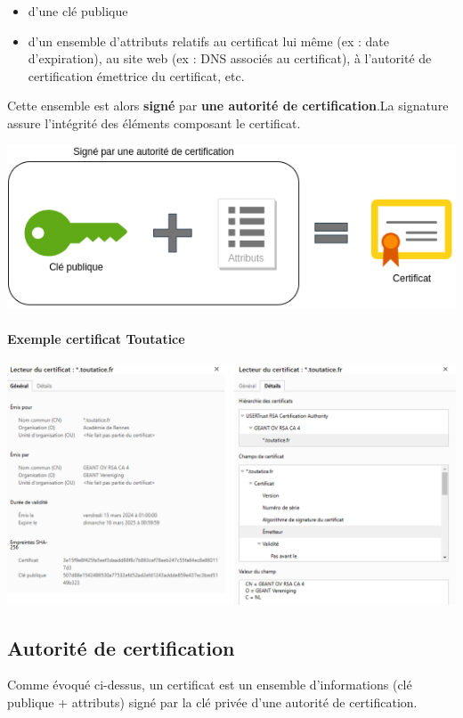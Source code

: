 \documentclass[french, 12pt]{article}%
\newcommand{\itemE}{\item[$\bullet$]}
\begin{document}
\begin{itemize}
\itemE d'une clé publique
\itemE d'un ensemble d'attributs relatifs au certificat lui même (ex : date d'expiration), au site web (ex : DNS associés au certificat), à l'autorité de certification émettrice du certificat, etc.
\end{itemize}

Cette ensemble est alors \textbf{signé} par \textbf{une autorité de certification}.La signature assure l’intégrité des éléments composant le certificat.

\begin{center}
\includegraphics[scale=0.7]{./ressource/certifcatDessin}
\end{center}

\paragraph{Exemple certificat Toutatice}
\begin{center}
\includegraphics[scale=0.5]{./ressource/certifcatToutatice.png}
\end{center}

\subsection{Autorité de certification}
Comme évoqué ci-dessus, un certificat est un ensemble d’informations (clé publique + attributs) signé par la clé privée d’une autorité de certification.
\end{document}
